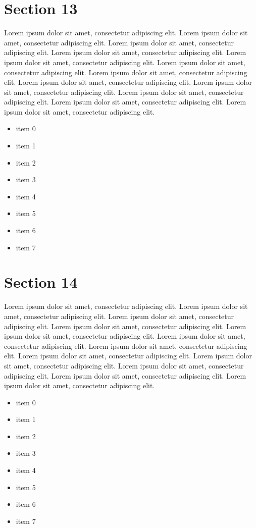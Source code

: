 \documentclass{article}
\begin{document}
\section{Section 13}
Lorem ipsum dolor sit amet, consectetur adipiscing elit. Lorem ipsum dolor sit amet, consectetur adipiscing elit. Lorem ipsum dolor sit amet, consectetur adipiscing elit. Lorem ipsum dolor sit amet, consectetur adipiscing elit. Lorem ipsum dolor sit amet, consectetur adipiscing elit. Lorem ipsum dolor sit amet, consectetur adipiscing elit. Lorem ipsum dolor sit amet, consectetur adipiscing elit. Lorem ipsum dolor sit amet, consectetur adipiscing elit. Lorem ipsum dolor sit amet, consectetur adipiscing elit. Lorem ipsum dolor sit amet, consectetur adipiscing elit. Lorem ipsum dolor sit amet, consectetur adipiscing elit. Lorem ipsum dolor sit amet, consectetur adipiscing elit. 
\begin{itemize}
\item item 0
\item item 1
\item item 2
\item item 3
\item item 4
\item item 5
\item item 6
\item item 7
\end{itemize}

\section{Section 14}
Lorem ipsum dolor sit amet, consectetur adipiscing elit. Lorem ipsum dolor sit amet, consectetur adipiscing elit. Lorem ipsum dolor sit amet, consectetur adipiscing elit. Lorem ipsum dolor sit amet, consectetur adipiscing elit. Lorem ipsum dolor sit amet, consectetur adipiscing elit. Lorem ipsum dolor sit amet, consectetur adipiscing elit. Lorem ipsum dolor sit amet, consectetur adipiscing elit. Lorem ipsum dolor sit amet, consectetur adipiscing elit. Lorem ipsum dolor sit amet, consectetur adipiscing elit. Lorem ipsum dolor sit amet, consectetur adipiscing elit. Lorem ipsum dolor sit amet, consectetur adipiscing elit. Lorem ipsum dolor sit amet, consectetur adipiscing elit. 
\begin{itemize}
\item item 0
\item item 1
\item item 2
\item item 3
\item item 4
\item item 5
\item item 6
\item item 7
\end{itemize}
\end{document}
